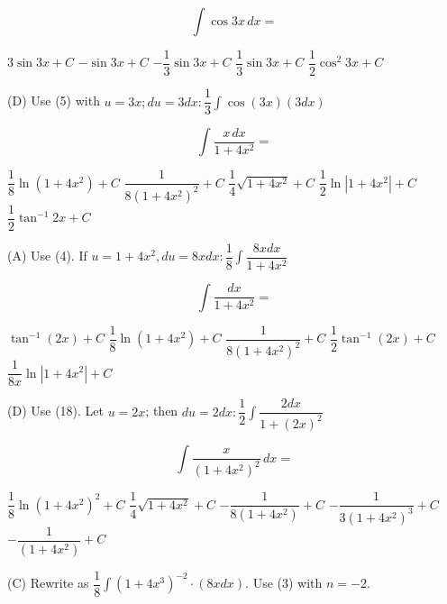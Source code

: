 \question
\[
\displaystyle\int \cos 3 x \,dx=
\]
\begin{choices}
  \choice $3 \sin 3 x+C$
  \choice $-\sin 3 x+C$
  \choice $-\dfrac{1}{3} \sin 3 x+C$
  \CorrectChoice $\dfrac{1}{3} \sin 3 x+C$
  \choice $\dfrac{1}{2} \cos ^{2} 3 x+C$
\end{choices}
\begin{solution}
(D) Use (5) with $u=3 x ; d u=3 d x: \dfrac{1}{3} \displaystyle\int \cos (3 x)(3 d x)$
\end{solution}





\newpage





\question\label{calc05:4x2-first}
\[
\displaystyle\int \dfrac{x \,dx}{1+4 x^{2}}=
\]
\begin{choices}
  \CorrectChoice $\dfrac{1}{8} \ln \left(1+4 x^{2}\right)+C$
  \choice $\dfrac{1}{8\left(1+4 x^{2}\right)^{2}}+C$
  \choice $\dfrac{1}{4} \sqrt{1+4 x^{2}}+C$
  \choice $\dfrac{1}{2} \ln \left|1+4 x^{2}\right|+C$
  \choice $\dfrac{1}{2} \tan ^{-1} 2 x+C$
\end{choices}
\begin{solution}
(A) Use (4). If $u=1+4 x^{2}, d u=8 x d x: \dfrac{1}{8} \displaystyle\int \dfrac{8 x d x}{1+4 x^{2}}$
\end{solution}

\question
\[
\displaystyle\int \dfrac{d x}{1+4 x^{2}}=
\]
\begin{choices}
  \choice $\tan ^{-1}(2 x)+C$
  \choice $\dfrac{1}{8} \ln \left(1+4 x^{2}\right)+C$
  \choice $\dfrac{1}{8\left(1+4 x^{2}\right)^{2}}+C$
  \CorrectChoice $\dfrac{1}{2} \tan ^{-1}(2 x)+C$
  \choice $\dfrac{1}{8 x} \ln \left|1+4 x^{2}\right|+C$
\end{choices}
\begin{solution}
(D) Use (18). Let $u=2 x$; then $d u=2 d x: \dfrac{1}{2} \displaystyle\int \dfrac{2 d x}{1+(2 x)^{2}}$
\end{solution}




\newpage




\question
\[
\displaystyle\int \dfrac{x}{\left(1+4 x^{2}\right)^{2}} \,dx=
\]
\begin{choices}
  \choice $\dfrac{1}{8} \ln \left(1+4 x^{2}\right)^{2}+C$
  \choice $\dfrac{1}{4} \sqrt{1+4 x^{2}}+C$
  \CorrectChoice $-\dfrac{1}{8\left(1+4 x^{2}\right)}+C$
  \choice $-\dfrac{1}{3\left(1+4 x^{2}\right)^{3}}+C$
  \choice $-\dfrac{1}{\left(1+4 x^{2}\right)}+C$
\end{choices}
\begin{solution}
(C) Rewrite as $\dfrac{1}{8} \displaystyle\int\left(1+4 x^{3}\right)^{-2} \cdot(8 x d x)$. Use (3) with $n=-2$.
\end{solution}

